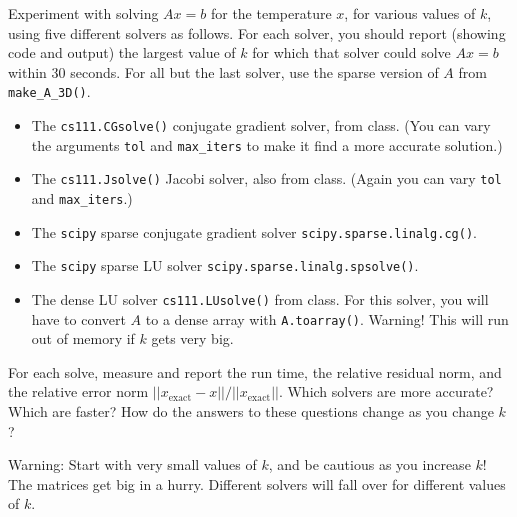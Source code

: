 \documentclass[11pt]{article}
\begin{document}
Experiment with solving $Ax=b$ for the temperature $x$, 
for various values of $k$, using five different solvers as follows.
For each solver, you should report (showing code and output) the
largest value of $k$ for which that solver could solve $Ax=b$ within 30 seconds.
For all but the last solver, use the sparse version of $A$ from {\tt make\_A\_3D()}.
\begin{itemize}
\item The {\tt cs111.CGsolve()} conjugate gradient solver, from class.
(You can vary the arguments {\tt tol} and {\tt max\_iters} to
make it find a more accurate solution.)
\item The {\tt cs111.Jsolve()} Jacobi solver, also from class.
(Again you can vary {\tt tol} and {\tt max\_iters}.)
\item The {\tt scipy} sparse conjugate gradient solver {\tt scipy.sparse.linalg.cg()}.
\item The {\tt scipy} sparse LU solver {\tt scipy.sparse.linalg.spsolve()}.
\item The dense LU solver {\tt cs111.LUsolve()} from class.
For this solver, you will have to convert $A$ to a dense array with {\tt A.toarray()}. 
Warning! This will run out of memory if $k$ gets very big.
\end{itemize}

For each solve, measure and report the run time, the relative residual norm, 
and the relative error norm $||x_{\mbox{exact}} - x||/||x_{\mbox{exact}}||$.
Which solvers are more accurate? Which are faster? 
How do the answers to these questions change as you change $k$?

Warning: Start with very small values of $k$, and be cautious as you increase $k$!
The matrices get big in a hurry.
Different solvers will fall over for different values of $k$.
\end{document}
